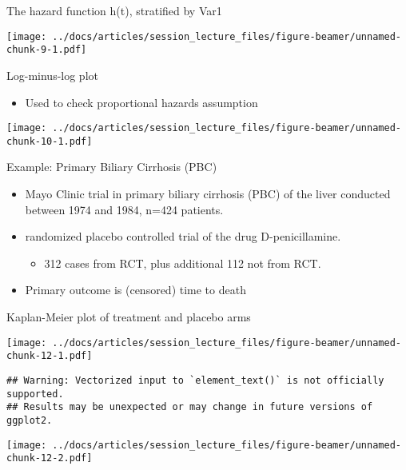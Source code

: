 \documentclass[
  ignorenonframetext,
]{beamer}
\providecommand{\tightlist}{%
  \setlength{\itemsep}{0pt}\setlength{\parskip}{0pt}}
\begin{document}
\begin{frame}{The hazard function h(t), stratified by Var1}
\protect\hypertarget{the-hazard-function-ht-stratified-by-var1}{}

\texttt{[image: ../docs/articles/session\_lecture\_files/figure-beamer/unnamed-chunk-9-1.pdf]}

\end{frame}

\begin{frame}{Log-minus-log plot}
\protect\hypertarget{log-minus-log-plot}{}

\begin{itemize}
\tightlist
\item
  Used to check proportional hazards assumption
\end{itemize}

\texttt{[image: ../docs/articles/session\_lecture\_files/figure-beamer/unnamed-chunk-10-1.pdf]}

\end{frame}

\begin{frame}{Example: Primary Biliary Cirrhosis (PBC)}
\protect\hypertarget{example-primary-biliary-cirrhosis-pbc}{}

\begin{itemize}
\tightlist
\item
  Mayo Clinic trial in primary biliary cirrhosis (PBC) of the liver
  conducted between 1974 and 1984, n=424 patients.
\item
  randomized placebo controlled trial of the drug D-penicillamine.

  \begin{itemize}
  \tightlist
  \item
    312 cases from RCT, plus additional 112 not from RCT.
  \end{itemize}
\item
  Primary outcome is (censored) time to death
\end{itemize}

\end{frame}

\begin{frame}[fragile]{Kaplan-Meier plot of treatment and placebo arms}
\protect\hypertarget{kaplan-meier-plot-of-treatment-and-placebo-arms}{}

\texttt{[image: ../docs/articles/session\_lecture\_files/figure-beamer/unnamed-chunk-12-1.pdf]}

\begin{verbatim}
## Warning: Vectorized input to `element_text()` is not officially supported.
## Results may be unexpected or may change in future versions of ggplot2.
\end{verbatim}

\texttt{[image: ../docs/articles/session\_lecture\_files/figure-beamer/unnamed-chunk-12-2.pdf]}

\end{frame}
\end{document}

